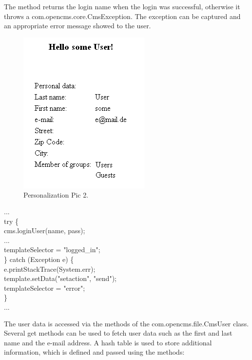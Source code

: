 The method returns the login name when the login was successful,
otherwise it throws a {\class com.opencms.core.CmsException}. 
The exception can be captured and an appropriate error message 
showed to the user.

\begin{figure}
\begin{center}
\includegraphics[clip,width=0.4\linewidth]{pics/modules/49}
\end{center}
\caption[Personalization Pic 2]{Personalization Pic 2.}
\label{HelloUser}
\end{figure}

\begin{java}
...\\
try \{\\
\jtabc                cms.loginUser(name, pass);\\
\jtabc                ...\\
\jtabc                templateSelector = "logged\_in";\\
\jtaba          \} catch (Exception e) \{\\
\jtabc                e.printStackTrace(System.err);\\
\jtabc                template.setData("setaction", "send");\\
\jtabc                templateSelector = "error";\\
\jtaba        \}\\
...\\
\end{java}

The user data is accessed via the methods of the {\class com.opencms.file.CmsUser} class. 
Several get methods can be used to fetch user data such as the first and last
name and the e-mail address. A hash table is used to store additional
information, which is defined and passed using the methods:

